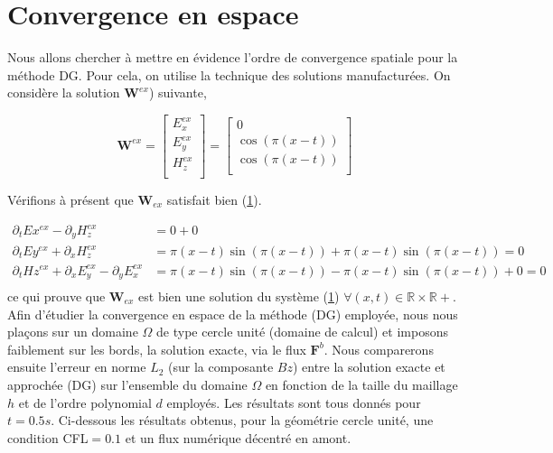\documentclass[a4paper,oneside,10pt]{report}
\begin{document}
\section{Convergence en espace}

Nous allons chercher à mettre en évidence l'ordre de convergence spatiale pour la méthode DG. Pour cela, on utilise la technique des solutions manufacturées. On considère la solution $\mathbf{W}^{ex}$) suivante,

\begin{equation}
\mathbf{W}^{ex}=
\begin{bmatrix}
E_x^{ex}\\
E_y^{ex}\\
H_z^{ex}\\
\end{bmatrix}
=
\begin{bmatrix}
0\\
\cos(\pi(x-t))\\
\cos(\pi(x-t))\\
\end{bmatrix}
\end{equation}

Vérifions à présent que $\mathbf{W}_{ex}$ satisfait bien (\ref{}).


\begin{equation}
\begin{aligned}
\partial_t Ex^{ex} - \partial_y H_z^{ex} &= 0 + 0\\
\partial_t Ey^{ex} + \partial_x H_z^{ex} &= \pi(x-t)\sin(\pi(x-t)) +\pi(x-t)\sin(\pi(x-t)) = 0\\
\partial_t Hz^{ex} + \partial_x E_y^{ex} - \partial_y E_x^{ex}  &= \pi(x-t)\sin(\pi(x-t)) - \pi(x-t)\sin(\pi(x-t)) + 0 = 0\\
\end{aligned}
\end{equation}
ce qui prouve que $\mathbf{W}_{ex}$ est bien une solution du système (\ref{}) $\forall (x,t) \in \mathbb{R} \times \mathbb{R}+$.\\


Afin d'étudier la convergence en espace de la méthode (DG) employée, nous nous plaçons sur un domaine $\Omega$ de type cercle unité (domaine de calcul) et imposons faiblement sur les bords, la solution exacte, via le flux $\mathbf{F}^b$.
 Nous comparerons ensuite l'erreur en norme $L_2$ (sur la composante $Bz$) entre la solution exacte et approchée (DG) sur l'ensemble du domaine $\Omega$ en fonction de la taille du maillage $h$ et de l'ordre polynomial $d$ employés. Les résultats sont tous donnés pour $t=0.5s$. Ci-dessous les résultats obtenus, pour la géométrie cercle unité, une condition CFL$=0.1$ et un flux numérique décentré en amont.
\end{document}
